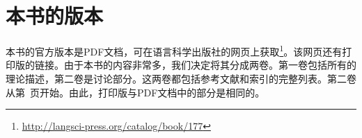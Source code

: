 
\section*{本书的版本}

本书的官方版本是PDF文档，可在语言科学出版社的网页上获取\footnote{%
\url{http://langsci-press.org/catalog/book/177}
}。该网页还有打印版的链接。由于本书的内容非常多，我们决定将其分成两卷。第一卷包括所有的理论描述，第二卷是讨论部分。这两卷都包括参考文献和索引的完整列表。第二卷从第~\pageref{part-discussion}页开始。由此，打印版与PDF文档中的部分是相同的。







